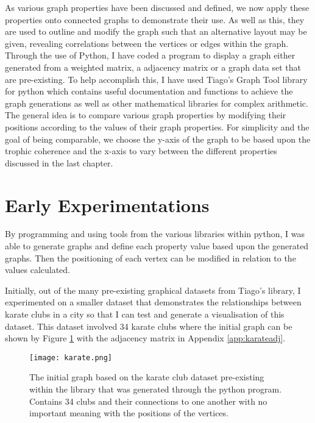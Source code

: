 As various graph properties have been discussed and defined, we now apply these properties onto connected graphs to demonstrate their use. As well as this, they are used to outline and modify the graph such that an alternative layout may be given, revealing correlations between the vertices or edges within the graph. Through the use of Python, I have coded a program to display a graph either generated from a weighted matrix, a adjacency matrix or a graph data set that are pre-existing. To help accomplish this, I have used Tiago's Graph Tool library for python which contains useful documentation and functions to achieve the graph generations as well as other mathematical libraries for complex arithmetic. The general idea is to compare various graph properties by modifying their positions according to the values of their graph properties. For simplicity and the goal of being comparable, we choose the y-axis of the graph to be based upon the trophic coherence and the x-axis to vary between the different properties discussed in the last chapter.

\section{Early Experimentations}
By programming and using tools from the various libraries within python, I was able to generate graphs and define each property value based upon the generated graphs. Then the positioning of each vertex can be modified in relation to the values calculated.

Initially, out of the many pre-existing graphical datasets from Tiago's library, I experimented on a smaller dataset that demonstrates the relationships between karate clubs in a city so that I can test and generate a visualisation of this dataset. This dataset involved 34 karate clubs where the initial graph can be shown by Figure \ref{fig:karate} with the adjacency matrix in Appendix \ref{app:karateadj}.

\begin{figure}[H]
	\centering
	\texttt{[image: karate.png]}
	\caption{The initial graph based on the karate club dataset pre-existing within the library that was generated through the python program. Contains 34 clubs and their connections to one another with no important meaning with the positions of the vertices.}
	\label{fig:karate}
\end{figure}


